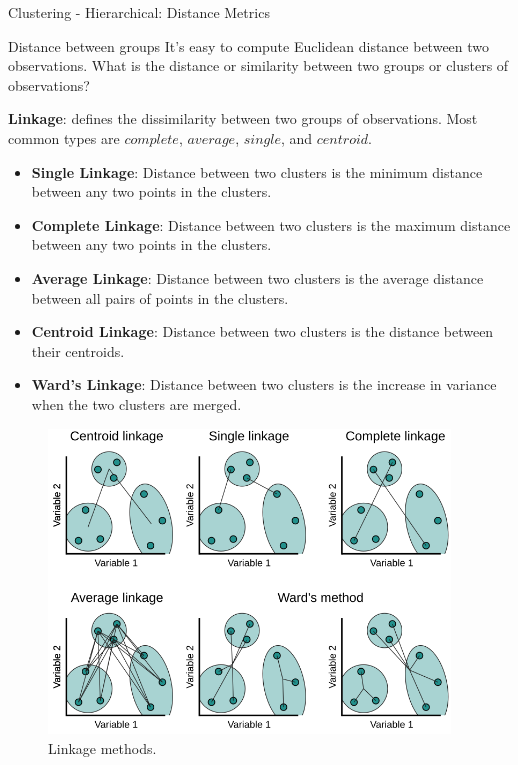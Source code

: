 \begin{frame}[allowframebreaks]{Clustering - Hierarchical: Distance Metrics}
\vspace*{-2em}
\begin{block}{Distance between groups}
    It’s easy to compute Euclidean distance between two observations.  What is the distance or similarity between two groups or clusters of  observations?
    
    \vspace{0.8em}
    \textbf{Linkage}: defines the dissimilarity between two groups of observations.  Most common types are $complete$, $average$, $single$, and $centroid$.
\end{block}

\framebreak

\begin{itemize}
    \setlength{\itemsep}{0.5em}
    \item \textbf{Single Linkage}: Distance between two clusters is the minimum distance between any two points in the clusters.
    \item \textbf{Complete Linkage}: Distance between two clusters is the maximum distance between any two points in the clusters.
    \item \textbf{Average Linkage}: Distance between two clusters is the average distance between all pairs of points in the clusters.
    \item \textbf{Centroid Linkage}: Distance between two clusters is the distance between their centroids.
    \item \textbf{Ward's Linkage}: Distance between two clusters is the increase in variance when the two clusters are merged.
\end{itemize}

\framebreak

\begin{figure}
    \centering
    \includegraphics[width=0.95\textwidth,height=0.85\textheight,keepaspectratio]{images/dul/hierarchical/linkage.png}
    \caption{Linkage methods.}
\end{figure}


\end{frame}
